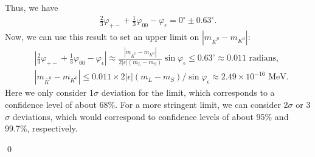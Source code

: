Thus, we have
\begin{align}
    \frac{2}{3} \varphi_{+-} + \frac{1}{3} \varphi_{00} - \varphi_\epsilon = 0^\circ \pm 0.63^\circ.
\end{align}
Now, we can use this result to set an upper limit on $|m_{\bar{K}^0} - m_{K^0}|$:
\begin{align}
    &\left|\frac{2}{3} \varphi_{+-} + \frac{1}{3} \varphi_{00} - \varphi_\epsilon\right| \approx \frac{|m_{\bar{K}^0} - m_{K^0}|}{2|\epsilon|(m_L - m_S)}\sin\varphi_\epsilon   \leq 0.63^\circ \approx 0.011 \text{ radians},  \\
    &|m_{\bar{K}^0} - m_{K^0}| \leq 0.011 \times 2|\epsilon|(m_L - m_S)/\sin\varphi_\epsilon\approx 2.49 \times 10^{-16} \text{ MeV}.
\end{align}
Here we only consider 1$\sigma$ deviation for the limit, which corresponds to a confidence level of about 68\%. For a more stringent limit, we can consider 2$\sigma$ or 3$\sigma$ deviations, which would correspond to confidence levels of about 95\% and 99.7\%, respectively.

\qed






